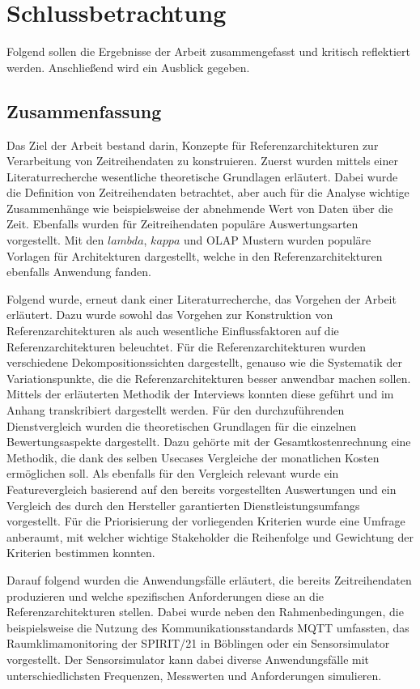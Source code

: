 \chapter{Schlussbetrachtung}\label{chapter:Schlussbetrachtung}
Folgend sollen die Ergebnisse der Arbeit zusammengefasst und kritisch reflektiert werden. Anschließend wird ein Ausblick gegeben.

\section{Zusammenfassung}\label{section:Zusammenfassung}
Das Ziel der Arbeit bestand darin, Konzepte für Referenzarchitekturen zur Verarbeitung von Zeitreihendaten zu konstruieren.
Zuerst wurden mittels einer Literaturrecherche wesentliche theoretische Grundlagen erläutert. Dabei wurde die Definition von Zeitreihendaten betrachtet, aber auch für die Analyse wichtige Zusammenhänge wie beispielsweise der abnehmende Wert von Daten über die Zeit. Ebenfalls wurden für Zeitreihendaten populäre Auswertungsarten vorgestellt. Mit den $lambda$, $kappa$ und \ac{OLAP} Mustern wurden populäre Vorlagen für Architekturen dargestellt, welche in den Referenzarchitekturen ebenfalls Anwendung fanden.

Folgend wurde, erneut dank einer Literaturrecherche, das Vorgehen der Arbeit erläutert. 
Dazu wurde sowohl das Vorgehen zur Konstruktion von Referenzarchitekturen als auch wesentliche Einflussfaktoren auf die Referenzarchitekturen beleuchtet. Für die Referenzarchitekturen wurden verschiedene Dekompositionssichten dargestellt, genauso wie die Systematik der Variationspunkte, die die Referenzarchitekturen besser anwendbar machen sollen.
Mittels der erläuterten Methodik der Interviews konnten diese geführt und im Anhang transkribiert dargestellt werden. 
Für den durchzuführenden Dienstvergleich wurden die theoretischen Grundlagen für die einzelnen Bewertungsaspekte dargestellt. Dazu gehörte mit der Gesamtkostenrechnung eine Methodik, die dank des selben Usecases Vergleiche der monatlichen Kosten ermöglichen soll. Als ebenfalls für den Vergleich relevant wurde ein Featurevergleich basierend auf den bereits vorgestellten Auswertungen und ein Vergleich des durch den Hersteller garantierten Dienstleistungsumfangs vorgestellt. Für die Priorisierung der vorliegenden Kriterien wurde eine Umfrage anberaumt, mit welcher wichtige Stakeholder die Reihenfolge und Gewichtung der Kriterien bestimmen konnten.

Darauf folgend wurden die Anwendungsfälle erläutert, die bereits Zeitreihendaten produzieren und welche spezifischen Anforderungen diese an die Referenzarchitekturen stellen. Dabei wurde neben den Rahmenbedingungen, die beispielsweise die Nutzung des Kommunikationsstandards \ac{MQTT} umfassten, das Raumklimamonitoring der SPIRIT/21 in Böblingen oder ein Sensorsimulator vorgestellt. Der Sensorsimulator kann dabei diverse Anwendungsfälle mit unterschiedlichsten Frequenzen, Messwerten und Anforderungen simulieren.

